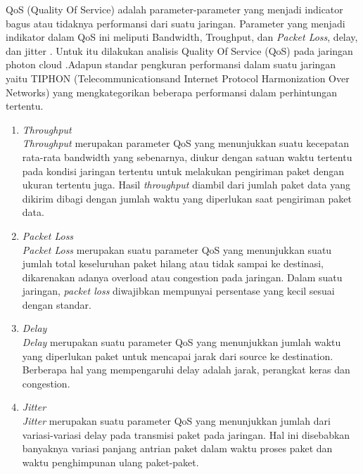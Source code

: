 QoS (Quality Of Service) adalah parameter-parameter yang menjadi indicator bagus atau
tidaknya performansi dari suatu jaringan. Parameter
yang menjadi indikator dalam QoS ini meliputi 
Bandwidth, Troughput, dan \textit{Packet Loss}, delay, dan
jitter \cite{qos}. Untuk itu dilakukan analisis Quality Of
Service (QoS) pada jaringan photon cloud .Adapun 
standar pengkuran performansi dalam suatu jaringan 
yaitu TIPHON (Telecommunicationsand Internet 
Protocol Harmonization Over Networks) yang 
mengkategorikan beberapa performansi dalam 
perhintungan tertentu.

\begin{enumerate}
	\item \textit{\textit{Throughput}} \\
	\textit{Throughput} merupakan parameter QoS yang 
menunjukkan suatu kecepatan rata-rata bandwidth
yang sebenarnya, diukur dengan satuan waktu 
tertentu pada kondisi jaringan tertentu untuk 
melakukan pengiriman paket dengan ukuran tertentu 
juga. Hasil \textit{throughput} diambil dari jumlah paket 
data yang dikirim dibagi dengan jumlah waktu yang 
diperlukan saat pengiriman paket data.
	\item \textit{Packet Loss} \\
	\textit{Packet Loss} merupakan suatu parameter QoS 
yang menunjukkan suatu jumlah total keseluruhan 
paket hilang atau tidak sampai ke destinasi, 
dikarenakan adanya overload atau congestion pada 
jaringan. Dalam suatu jaringan, \textit{packet loss}
diwajibkan mempunyai persentase yang kecil sesuai 
dengan standar. 
\item \textit{Delay} \\
\textit{Delay} merupakan suatu parameter QoS yang 
menunjukkan jumlah waktu yang diperlukan paket 
untuk mencapai jarak dari source ke destination. 
Berberapa hal yang mempengaruhi delay adalah 
jarak, perangkat keras dan congestion. 
\item \textit{Jitter}\\
\textit{Jitter} merupakan suatu parameter QoS yang 
menunjukkan jumlah dari variasi-variasi delay pada 
transmisi paket pada jaringan. Hal ini disebabkan 
banyaknya variasi panjang antrian paket dalam 
waktu proses paket dan waktu penghimpunan ulang 
paket-paket.


\end{enumerate}






